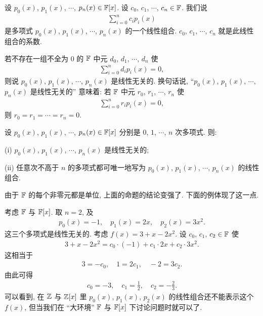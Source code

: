 \begin{definition}
    设 $p_0 (x)$, $p_1 (x)$, $\cdots$, $p_n (x) \in \mathbb{F}[x]$. 设 $c_0$, $c_1$, $\cdots$, $c_n \in \mathbb{F}$. 我们说
    \begin{align*}
        \sum_{i = 0}^{n} c_i p_i (x)
    \end{align*}
    是多项式 $p_0 (x)$, $p_1 (x)$, $\cdots$, $p_n (x)$ 的一个线性组合. $c_0$, $c_1$, $\cdots$, $c_n$ 就是此线性组合的系数.

    若不存在一组不全为 $0$ 的 $\mathbb{F}$ 中元 $d_0$, $d_1$, $\cdots$, $d_n$ 使
    \begin{align*}
        \sum_{i = 0}^{n} d_i p_i (x) = 0,
    \end{align*}
    则说 $p_0 (x)$, $p_1 (x)$, $\cdots$, $p_n (x)$ 是线性无关的. 换句话说, ``$p_0 (x)$, $p_1 (x)$, $\cdots$, $p_n (x)$ 是线性无关的'' 意味着: 若 $\mathbb{F}$ 中元 $r_0$, $r_1$, $\cdots$, $r_n$ 使
    \begin{align*}
        \sum_{i = 0}^{n} r_i p_i (x) = 0,
    \end{align*}
    则 $r_0 = r_1 = \cdots = r_n = 0$.
\end{definition}

\begin{proposition}
    设 $p_0 (x)$, $p_1 (x)$, $\cdots$, $p_n (x) \in \mathbb{F}[x]$ 分别是 $0$, $1$, $\cdots$, $n$ 次多项式. 则:

    (i) $p_0 (x)$, $p_1 (x)$, $\cdots$, $p_n (x)$ 是线性无关的;

    (ii) 任意次不高于 $n$ 的多项式都可唯一地写为 $p_0 (x)$, $p_1 (x)$, $\cdots$, $p_n (x)$ 的线性组合.
\end{proposition}

由于 $\mathbb{F}$ 的每个非零元都是单位, 上面的命题的结论变强了. 下面的例体现了这一点.

\begin{example}
    考虑 $\mathbb{F}$ 与 $\mathbb{F}[x]$. 取 $n=2$, 及
    \begin{align*}
        p_0 (x) = -1, \quad p_1 (x) = 2x, \quad p_2 (x) = 3x^2.
    \end{align*}
    这三个多项式是线性无关的. 考虑 $f(x) = 3 + x - 2x^2$. 设 $c_0$, $c_1$, $c_2 \in \mathbb{F}$ 使
    \begin{align*}
        3 + x - 2x^2 = c_0 \cdot (-1) + c_1 \cdot 2x + c_2 \cdot 3x^2.
    \end{align*}
    这相当于
    \begin{align*}
        3 = -c_0, \quad 1 = 2c_1, \quad -2 = 3c_2.
    \end{align*}
    由此可得
    \begin{align*}
        c_0 = -3, \quad c_1 = \frac12, \quad c_2 = -\frac23.
    \end{align*}
    可以看到, 在 $\mathbb{Z}$ 与 $\mathbb{Z}[x]$ 里 $p_0 (x)$, $p_1 (x)$, $p_2 (x)$ 的线性组合还不能表示这个 $f(x)$, 但当我们在 ``大环境'' $\mathbb{F}$ 与 $\mathbb{F}[x]$ 下讨论问题时就可以了.
\end{example}

